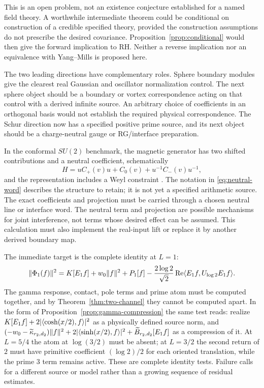 This is an open problem, not an existence conjecture established for
a named field theory. A worthwhile intermediate theorem could be
conditional on construction of a credible specified theory, provided
the construction assumptions do not prescribe the desired covariance.
Proposition~\ref{prop:conditional} would then give the forward
implication to RH. Neither a reverse implication nor an equivalence
with Yang--Mills is proposed here.

The two leading directions have complementary roles. Sphere boundary
modules give the clearest real Gaussian and oscillator normalization
control. The next sphere object should be a boundary or vortex
correspondence acting on that control with a derived infinite source.
An arbitrary choice of coefficients in an orthogonal basis would not
establish the required physical correspondence. The Schur direction
now has a specified positive prime source, and its next object should
be a charge-neutral gauge or RG/interface preparation.

In the conformal $SU(2)$ benchmark, the magnetic generator has two
shifted contributions and a neutral coefficient, schematically
\begin{equation}\label{eq:neutral-word}
 H=uC_+(v)u+C_0(v)+u^{-1}C_-(v)u^{-1},
\end{equation}
and the representation includes a Weyl constraint
\cite[Sections 5.1.2--5.1.3]{Schur}. The notation in
\eqref{eq:neutral-word} describes the structure to retain; it is not
yet a specified arithmetic source. The exact coefficients and projection
must be carried through a chosen neutral line or interface word. The
neutral term and projection are possible mechanisms for joint
interference, not terms whose desired effect can be assumed. This
calculation must also implement the real-input lift or replace it by
another derived boundary map.

The immediate target is the complete identity at $L=1$:
\begin{equation}\label{eq:first-target}
 \lVert \Phi_1(f)\rVert^2=K[E_1f]+w_0\lVert f\rVert^2+P_1[f]
 -\frac{2\log2}{\sqrt2}\operatorname{Re}\langle E_1f,U_{\log2}E_1f\rangle.
\end{equation}
The gamma response, contact, pole terms and prime atom must be computed
together, and by Theorem~\ref{thm:two-channel} they cannot be computed
apart. In the form of Proposition~\ref{prop:gamma-compression} the same test
reads: realize $K[E_1f]+2|\langle \cosh(x/2),f\rangle|^2$ as a physically defined source
norm, and
$(-w_0-\widetilde\kappa_{r_2,d_2})\lVert f\rVert^2+2|\langle \sinh(x/2),f\rangle|^2
+\widetilde B_{r_2,d_2}[E_1f]$ as a compression of it. At $L=5/4$ the atom at $\log(3/2)$ must be absent; at $L=3/2$
the second return of $2$ must have primitive coefficient $(\log2)/2$
for each oriented translation, while the prime $3$ term remains active.
These are complete identity tests. Failure calls for a different source
or model rather than a growing sequence of residual estimates.

